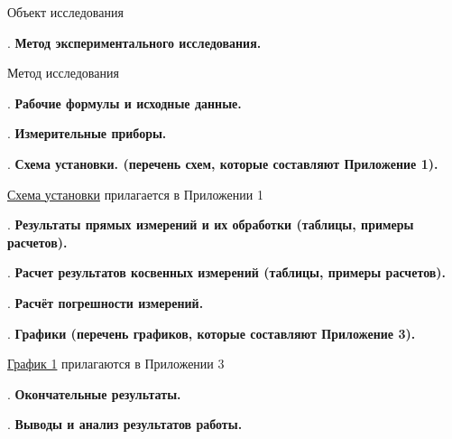 \documentclass[12pt]{article}
\newcommand{\placeholder}[1]{{\color{magenta}#1}}
\begin{document}
    \placeholder{Объект исследования}

    \mediumvspace

    . \textbf{Метод экспериментального исследования.}

    \placeholder{Метод исследования}

    \mediumvspace

    . \textbf{Рабочие формулы и исходные данные.}

    

    \mediumvspace

    \clearpage

    . \textbf{Измерительные приборы.}

    \smallvspace

    

    \mediumvspace

    . \textbf{Схема установки. (перечень схем, которые составляют Приложение 1).}

    \hyperlink{schema1}{Схема установки} прилагается в Приложении 1

    \mediumvspace

    . \textbf{Результаты прямых измерений и их обработки (таблицы, примеры расчетов).}

    

    \mediumvspace

    . \textbf{Расчет результатов косвенных измерений (таблицы, примеры расчетов).}

    

    \mediumvspace

    . \textbf{Расчёт погрешности измерений.}

    \mediumvspace

    . \textbf{Графики (перечень графиков, которые составляют Приложение 3).}

    \hyperlink{diagram1}{График 1} прилагаются в Приложении 3

    \mediumvspace

    . \textbf{Окончательные результаты.}

    

    \mediumvspace

    . \textbf{Выводы и анализ результатов работы.}

    
\end{document}

